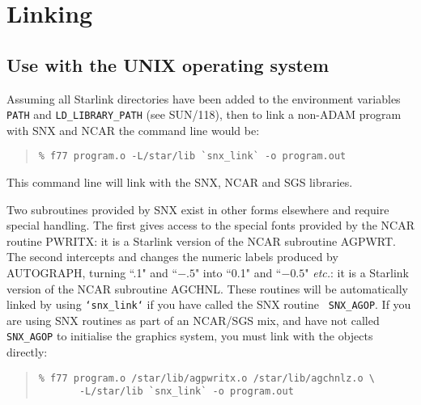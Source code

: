 \section {Linking} \label{link_sect}

\subsection {Use with the UNIX operating system}

\begin{sloppypar} Assuming all Starlink directories have been added to
the environment variables {\tt PATH} and {\tt LD\_LIBRARY\_PATH} (see
SUN/118), then to link a non-ADAM program with SNX and NCAR the command
line would be:  \end{sloppypar}

\begin {quote}
\begin {small}
\begin{verbatim}
% f77 program.o -L/star/lib `snx_link` -o program.out
\end{verbatim}
\end {small}
\end {quote}

This command line will link with the SNX, NCAR and SGS libraries.

Two subroutines provided by SNX exist in other forms elsewhere and
require special handling.  The first gives access to the special fonts
provided by the NCAR routine PWRITX:  it is a Starlink version of the
NCAR subroutine AGPWRT.  The second intercepts and changes the numeric
labels produced by AUTOGRAPH, turning ``.1" and ``$-.5$" into ``0.1"
and ``$-0.5$" {\em etc.}: it is a Starlink version of the NCAR
subroutine AGCHNL.  These routines will be automatically linked by
using {\tt `snx\_link`} if you have called the SNX routine {\tt
SNX\_AGOP}.   If you are using SNX routines as part of an NCAR/SGS mix,
and have not called {\tt SNX\_AGOP} to initialise the graphics system,
you must link with the objects directly:

\begin {quote}
\begin {small}
\begin{verbatim}
% f77 program.o /star/lib/agpwritx.o /star/lib/agchnlz.o \
       -L/star/lib `snx_link` -o program.out
\end{verbatim}
\end {small}
\end {quote}

